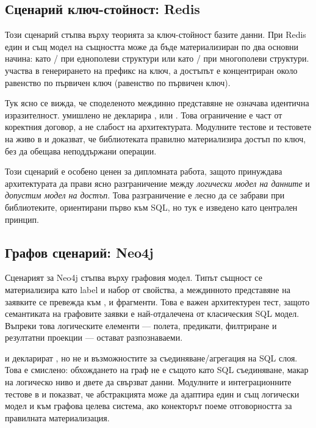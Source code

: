 \subsection{Сценарий ключ-стойност: Redis}

Този сценарий стъпва върху теорията за ключ-стойност базите данни. При Redis един и същ модел на същността може да бъде материализиран по два основни начина: като / при еднополеви структури или като / при многополеви структури.  участва в генерирането на префикс на ключ, а достъпът е концентриран около равенство по първичен ключ (равенство по първичен ключ).

Тук ясно се вижда, че споделеното междинно представяне не означава идентична изразителност.  умишлено не декларира ,  или . Това ограничение е част от коректния договор, а не слабост на архитектурата. Модулните тестове и тестовете на живо в  и  доказват, че библиотеката правилно материализира достъп по ключ, без да обещава неподдържани операции.

Този сценарий е особено ценен за дипломната работа, защото принуждава архитектурата да прави ясно разграничение между \emph{логически модел на данните} и \emph{допустим модел на достъп}. Това разграничение е лесно да се забрави при библиотеките, ориентирани първо към SQL, но тук е изведено като централен принцип.

\subsection{Графов сценарий: Neo4j}

Сценарият за Neo4j стъпва върху графовия модел. Типът същност се материализира като label и набор от свойства, а междинното представяне на заявките се превежда към ,  и  фрагменти. Това е важен архитектурен тест, защото семантиката на графовите заявки е най-отдалечена от класическия SQL модел. Въпреки това логическите елементи --- полета, предикати, филтриране и резултатни проекции --- остават разпознаваеми.

 и  декларират , но не и възможностите за съединяване/агрегация на SQL слоя. Това е смислено: обхождането на граф не е същото като SQL съединяване, макар на логическо ниво и двете да свързват данни. Модулните и интеграционните тестове в  и  показват, че абстракцията може да адаптира един и същ логически модел и към графова целева система, ако конекторът поеме отговорността за правилната материализация.

